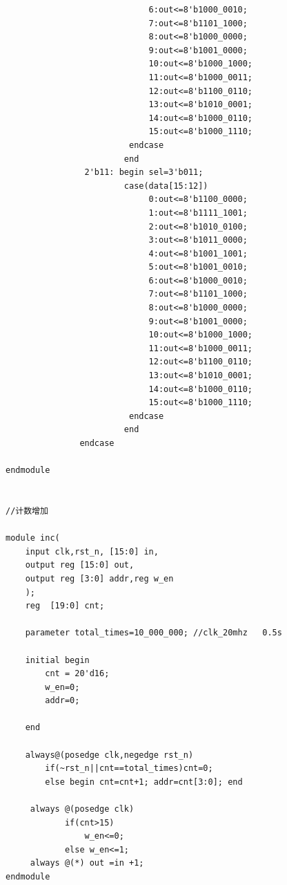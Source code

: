 \documentclass[UTF8]{ctexart}
\begin{document}
\begin{verbatim}
                             6:out<=8'b1000_0010;
                             7:out<=8'b1101_1000;
                             8:out<=8'b1000_0000;
                             9:out<=8'b1001_0000;
                             10:out<=8'b1000_1000;
                             11:out<=8'b1000_0011;
                             12:out<=8'b1100_0110;
                             13:out<=8'b1010_0001;
                             14:out<=8'b1000_0110;
                             15:out<=8'b1000_1110;
                         endcase
                        end
                2'b11: begin sel=3'b011;
                        case(data[15:12])    
                             0:out<=8'b1100_0000;
                             1:out<=8'b1111_1001;
                             2:out<=8'b1010_0100;
                             3:out<=8'b1011_0000;                    
                             4:out<=8'b1001_1001;
                             5:out<=8'b1001_0010;
                             6:out<=8'b1000_0010;
                             7:out<=8'b1101_1000;
                             8:out<=8'b1000_0000;
                             9:out<=8'b1001_0000;
                             10:out<=8'b1000_1000;
                             11:out<=8'b1000_0011;
                             12:out<=8'b1100_0110;
                             13:out<=8'b1010_0001;
                             14:out<=8'b1000_0110;
                             15:out<=8'b1000_1110;
                         endcase
                        end
               endcase
                 
endmodule


//计数增加

module inc(
    input clk,rst_n, [15:0] in,
    output reg [15:0] out,
    output reg [3:0] addr,reg w_en
    );    
    reg  [19:0] cnt;
    
    parameter total_times=10_000_000; //clk_20mhz   0.5s    

    initial begin
        cnt = 20'd16;
        w_en=0;
        addr=0;
        
    end
    
    always@(posedge clk,negedge rst_n)
        if(~rst_n||cnt==total_times)cnt=0;
        else begin cnt=cnt+1; addr=cnt[3:0]; end 
     
     always @(posedge clk)
            if(cnt>15)
                w_en<=0;
            else w_en<=1; 
     always @(*) out =in +1;
endmodule
\end{verbatim}
\end{document}
